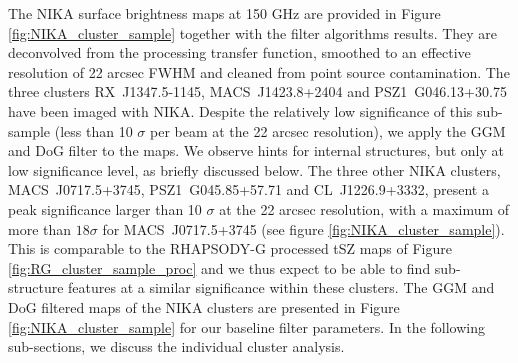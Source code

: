 \documentclass[twocolumn,traditabstract]{aa}
\begin{document}
The NIKA surface brightness maps at 150 GHz are provided in Figure \ref{fig:NIKA_cluster_sample} together with the filter algorithms results. They are deconvolved from the processing transfer function, smoothed to an effective resolution of 22 arcsec FWHM and cleaned from point source contamination. The three clusters \mbox{RX~J1347.5-1145}, \mbox{MACS~J1423.8+2404} and \mbox{PSZ1~G046.13+30.75} have been imaged with NIKA. Despite the relatively low significance of this sub-sample (less than 10 $\sigma$ per beam at the 22 arcsec resolution), we apply the GGM and DoG filter to the maps. We observe hints for internal structures, but only at low significance level, as briefly discussed below. The three other NIKA clusters, \mbox{MACS~J0717.5+3745}, \mbox{PSZ1~G045.85+57.71} and \mbox{CL~J1226.9+3332}, present a peak significance larger than 10 $\sigma$ at the 22 arcsec resolution, with a maximum of more than $18 \sigma$ for \mbox{MACS~J0717.5+3745} (see figure \ref{fig:NIKA_cluster_sample}). This is comparable to the RHAPSODY-G processed tSZ maps of Figure \ref{fig:RG_cluster_sample_proc} and we thus expect to be able to find sub-structure features at a similar significance within these clusters. The GGM and DoG filtered maps of the NIKA clusters are presented in Figure \ref{fig:NIKA_cluster_sample} for our baseline filter parameters. In the following sub-sections, we discuss the individual cluster analysis.

\end{document}
